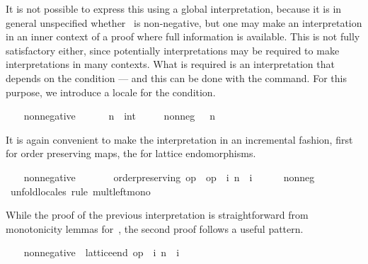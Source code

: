 \begin{isabellebody}
\begin{isamarkuptext}
  It is not possible to express this using a global interpretation,
  because it is in general unspecified whether~ is
  non-negative, but one may make an interpretation in an inner context
  of a proof where full information is available.
  This is not fully satisfactory either, since potentially
  interpretations may be required to make interpretations in many
  contexts.  What is
  required is an interpretation that depends on the condition --- and
  this can be done with the  command.  For this
  purpose, we introduce a locale for the condition.%
\end{isamarkuptext}%
\isamarkuptrue%
\ \ \isamarkupfalse%
\ non{\isacharunderscore}negative\ {\isacharequal}\isanewline
\ \ \ \ \ n\ {\isacharcolon}{\isacharcolon}\ int\isanewline
\ \ \ \ \ non{\isacharunderscore}neg{\isacharcolon}\ {\isachardoublequoteopen}{}\ {\isasymle}\ n{\isachardoublequoteclose}%
\begin{isamarkuptext}%
It is again convenient to make the interpretation in an
  incremental fashion, first for order preserving maps, the for
  lattice endomorphisms.%
\end{isamarkuptext}%
\isamarkuptrue%
\ \ \isamarkupfalse%
\ non{\isacharunderscore}negative\ {\isasymsubseteq}\isanewline
\ \ \ \ \ \ order{\isacharunderscore}preserving\ {\isachardoublequoteopen}op\ {\isasymle}{\isachardoublequoteclose}\ {\isachardoublequoteopen}op\ {\isasymle}{\isachardoublequoteclose}\ {\isachardoublequoteopen}{\isasymlambda}i{\isachardot}\ n\ {\isacharasterisk}\ i{\isachardoublequoteclose}\isanewline
%
\isadelimproof
\ \ \ \ %
\endisadelimproof
%
\isatagproof
{}\isamarkupfalse%
\ non{\isacharunderscore}neg\ \isamarkupfalse%
\ unfold{\isacharunderscore}locales\ {\isacharparenleft}rule\ mult{\isacharunderscore}left{\isacharunderscore}mono{\isacharparenright}%
\endisatagproof
{\isafoldproof}%
%
\isadelimproof
%
\endisadelimproof
%
\begin{isamarkuptext}%
While the proof of the previous interpretation
  is straightforward from monotonicity lemmas for~, the
  second proof follows a useful pattern.%
\end{isamarkuptext}%
\isamarkuptrue%
%
\isadelimvisible
\ \ %
\endisadelimvisible
%
\isatagvisible
{}\isamarkupfalse%
\ non{\isacharunderscore}negative\ {\isasymsubseteq}\ lattice{\isacharunderscore}end\ {\isachardoublequoteopen}op\ {\isasymle}{\isachardoublequoteclose}\ {\isachardoublequoteopen}{\isasymlambda}i{\isachardot}\ n\ {\isacharasterisk}\ i{\isachardoublequoteclose}\isanewline

\end{isabellebody}
